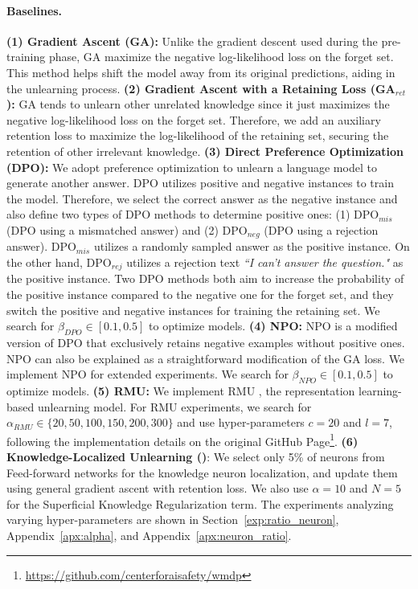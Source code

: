\paragraph{Baselines.}
\textbf{(1) Gradient Ascent (GA):} Unlike the gradient descent used during the pre-training phase, GA \citep{jang2022knowledge, yao2023large} maximize the negative log-likelihood loss on the forget set. This method helps shift the model away from its original predictions, aiding in the unlearning process.
\textbf{(2) Gradient Ascent with a Retaining Loss (GA$_{ret}$):} GA tends to unlearn other unrelated knowledge since it just maximizes the negative log-likelihood loss on the forget set. Therefore, we add an auxiliary retention loss to maximize the log-likelihood of the retaining set, securing the retention of other irrelevant knowledge.
\textbf{(3) Direct Preference Optimization (DPO):} We adopt preference optimization to unlearn a language model to generate another answer. DPO \citep{rafailov2024direct, jin2024rwku} utilizes positive and negative instances to train the model.
Therefore, we select the correct answer as the negative instance and also define two types of DPO methods to determine positive ones: (1) DPO$_{mis}$ (DPO using a mismatched answer) and (2) DPO$_{neg}$ (DPO using a rejection answer).
DPO$_{mis}$ utilizes a randomly sampled answer as the positive instance.
On the other hand, DPO$_{rej}$ utilizes a rejection text \textit{``I can't answer the question."} as the positive instance.
Two DPO methods both aim to increase the probability of the positive instance compared to the negative one for the forget set, and they switch the positive and negative instances for training the retaining set.
We search for $\beta_{DPO} \in [0.1, 0.5]$ to optimize models.
\textbf{(4) NPO:} NPO is a modified version of DPO that exclusively retains negative examples without positive ones. NPO can also be explained as a straightforward modification of the GA loss. We implement NPO \citep{zhang2024negative} for extended experiments. We search for $\beta_{NPO} \in [0.1, 0.5]$ to optimize models.
\textbf{(5) RMU:} We implement RMU \citep{li2024wmdp}, the representation learning-based unlearning model.
For RMU experiments, we search for $\alpha_{RMU} \in \{20, 50, 100, 150, 200, 300\}$ and use hyper-parameters $c=20$ and $l=7$, following the implementation details on the original GitHub Page\footnote{\url{https://github.com/centerforaisafety/wmdp}}.
\textbf{(6) Knowledge-Localized Unlearning (\ourmodel)}:
We select only 5\% of neurons from Feed-forward networks for the knowledge neuron localization, and update them using general gradient ascent with retention loss.
We also use $\alpha = 10$ and $N = 5$ for the Superficial Knowledge Regularization term.
The experiments analyzing varying hyper-parameters are shown in Section~\ref{exp:ratio_neuron}, Appendix~\ref{apx:alpha}, and Appendix~\ref{apx:neuron_ratio}.






